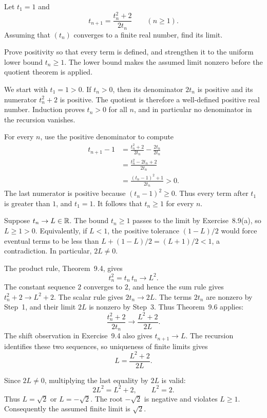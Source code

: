 \goal Let $t_1=1$ and
\[
 t_{n+1}=\frac{t_n^2+2}{2t_n}\qquad(n\ge1).
\]
Assuming that $(t_n)$ converges to a finite real number, find its limit.

\idea Prove positivity so that every term is defined, and strengthen
it to the uniform lower bound $t_n\ge1$. The lower bound makes the
assumed limit nonzero before the quotient theorem is applied.

We start with $t_1=1>0$. If $t_n>0$, then its denominator
$2t_n$ is positive and its numerator $t_n^2+2$ is positive.
The quotient is therefore a well-defined positive real number.
Induction proves $t_n>0$ for all $n$, and in particular no
denominator in the recursion vanishes.

For every $n$, use the positive denominator to compute
\begin{align*}
 t_{n+1}-1
 &=\frac{t_n^2+2}{2t_n}-\frac{2t_n}{2t_n}\\
 &=\frac{t_n^2-2t_n+2}{2t_n}\\
 &=\frac{(t_n-1)^2+1}{2t_n}>0.
\end{align*}
The last numerator is positive because $(t_n-1)^2\ge0$.
Thus every term after $t_1$ is greater than $1$, and $t_1=1$.
It follows that $t_n\ge1$ for every $n$.

Suppose $t_n\to L\in\mathbb{R}$. The bound $t_n\ge1$ passes to the
limit by Exercise~8.9(a), so $L\ge1>0$.
Equivalently, if $L<1$, the positive tolerance $(1-L)/2$
would force eventual terms to be less than
$L+(1-L)/2=(L+1)/2<1$, a contradiction.
In particular, $2L\ne0$.

The product rule, Theorem~9.4, gives
\[
 t_n^2=t_n\,t_n\longrightarrow L^2.
\]
The constant sequence $2$ converges to $2$, and hence the sum rule
gives $t_n^2+2\to L^2+2$. The scalar rule gives
$2t_n\to2L$. The terms $2t_n$ are nonzero by Step~1,
and their limit $2L$ is nonzero by Step~3. Thus Theorem~9.6 applies:
\[
 \frac{t_n^2+2}{2t_n}\longrightarrow\frac{L^2+2}{2L}.
\]
The shift observation in Exercise~9.4 also gives $t_{n+1}\to L$.
The recursion identifies these two sequences, so uniqueness of
finite limits gives
\[
 L=\frac{L^2+2}{2L}.
\]

Since $2L\ne0$, multiplying the last equality by $2L$ is valid:
\[
 2L^2=L^2+2,
 \qquad L^2=2.
\]
Thus $L=\sqrt2$ or $L=-\sqrt2$.
The root $-\sqrt2$ is negative and violates $L\ge1$.
Consequently the assumed finite limit is $\sqrt2$.

